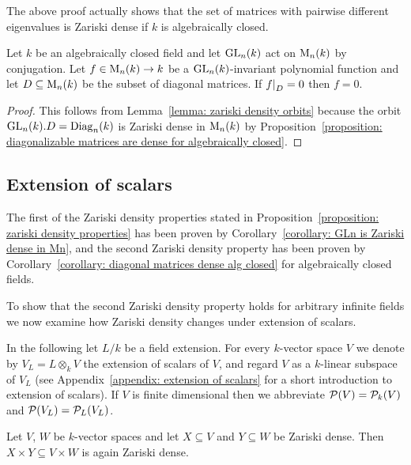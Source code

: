 \begin{remark}
  The above proof actually shows that the set of matrices with pairwise different eigenvalues is Zariski dense if $k$ is algebraically closed.
\end{remark}


\begin{corollary}
  \label{corollary: diagonal matrices dense alg closed}
  Let $k$ be an algebraically closed field and let $\operatorname{GL}_n(k)$ act on $\operatorname{M}_n(k)$ by conjugation.
  Let $f \in \operatorname{M}_n(k) \to k$ be a $\operatorname{GL}_n(k)$-invariant polynomial function and let $D \subseteq \operatorname{M}_n(k)$ be the subset of diagonal matrices.
  If $\restrict{f}{D} = 0$ then $f = 0$.
\end{corollary}
\begin{proof}
  This follows from Lemma~\ref{lemma: zariski density orbits} because the orbit $\operatorname{GL}_n(k).D = \operatorname{Diag}_n(k)$ is Zariski dense in $\operatorname{M}_n(k)$ by Proposition~\ref{proposition: diagonalizable matrices are dense for algebraically closed}.
\end{proof}





\subsection*{Extension of scalars}


\begin{fluff}
  The first of the Zariski density properties stated in Proposition~\ref{proposition: zariski density properties} has been proven by Corollary~\ref{corollary: GLn is Zariski dense in Mn}, and the second Zariski density property has been proven by Corollary~\ref{corollary: diagonal matrices dense alg closed} for algebraically closed fields.
  
  To show that the second Zariski density property holds for arbitrary infinite fields we now examine how Zariski density changes under extension of scalars.
  
  In the following let $L/k$ be a field extension.
  For every $k$-vector space $V$ we denote by $V_L = L \otimes_k V$ the extension of scalars of $V$, and regard $V$ as a $k$-linear subspace of $V_L$ (see Appendix~\ref{appendix: extension of scalars} for a short introduction to extension of scalars).
  If $V$ is finite dimensional then we abbreviate $\mathcal{P}(V) = \mathcal{P}_k(V)$ and $\mathcal{P}(V_L) = \mathcal{P}_L(V_L)$.
\end{fluff}


\begin{lemma}
  \label{lemma: product of Zariski dense is again Zariski dense}
  Let $V$, $W$ be $k$-vector spaces and let $X \subseteq V$ and $Y \subseteq W$ be Zariski dense.
  Then $X \times Y \subseteq V \times W$ is again Zariski dense.
\end{lemma}


